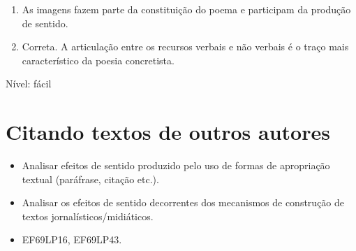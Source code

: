\begin{enumerate}
\def\labelenumi{\arabic{enumi}.}
\item
  As imagens fazem parte da constituição do poema e participam da
  produção de sentido.
\item
  Correta. A articulação entre os recursos verbais e não verbais é o
  traço mais característico da poesia concretista.
\end{enumerate}

Nível: fácil


\chapter{Citando textos de outros autores}


\begin{itemize}
  
  \item Analisar efeitos de sentido produzido pelo uso de formas de apropriação 
  textual (paráfrase, citação etc.).
  
  \item Analisar os efeitos de sentido decorrentes dos mecanismos de construção 
  de textos jornalísticos/midiáticos.

\end{itemize}


\begin{itemize}

  \item EF69LP16, EF69LP43.

\end{itemize}

